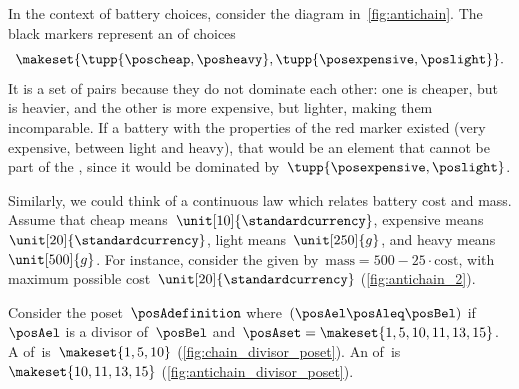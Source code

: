 \begin{marginfigure}
    \centering
    \caption{Example of discrete .
    }
    \label{fig:antichain}
\end{marginfigure}
\begin{example}
    In the context of battery choices, consider the diagram in~\cref{fig:antichain}.
    The black markers represent an  of choices
    \begin{equation}\label{eq:example-battery-antichain}
        \makeset{
            \tupp{\poscheap,\posheavy},
            \tupp{\posexpensive,\poslight}
        }.
    \end{equation}
    It is a set of pairs because they do not dominate each other: one is cheaper, but is heavier, and the other is more expensive, but lighter, making them incomparable.
    If a battery with the properties of the red marker existed (very expensive, between light and heavy), that would be an element that cannot be part of the , since it would be dominated by~$\tupp{\posexpensive,\poslight}$.
    \begin{marginfigure}
        \centering
        \caption{Example of continuous .}
        \label{fig:antichain_2}
    \end{marginfigure}
    Similarly, we could think of a continuous law which relates battery cost and mass.
    Assume that cheap means~$\unit[10]{\standardcurrency}$, expensive means~$\unit[20]{\standardcurrency}$, light means~$\unit[250]{g}$, and heavy means~$\unit[500]{g}$.
    For instance, consider the  given by~$\text{mass}=500-25\cdot \text{cost}$, with maximum possible cost~$\unit[20]{\standardcurrency}$ (\cref{fig:antichain_2}).
\end{example}

\vspace{5cm}

\begin{marginfigure}
    \centering
    \caption{}
    \label{fig:chain_divisor_poset}
\end{marginfigure}

\begin{marginfigure}
    \centering
    \caption{}
    \label{fig:antichain_divisor_poset}
\end{marginfigure}

\begin{example}
    Consider the poset~$\posAdefinition$ where~$(\posAel \posAleq \posBel)$ if~$\posAel$ is a divisor of~$\posBel$ and~$\posAset=\makeset{1,5,10,11,13,15}$.
    A  of~\posA is~$\makeset{1,5,10}$ (\cref{fig:chain_divisor_poset}).
    An  of~\posA is~$\makeset{10,11,13,15}$ (\cref{fig:antichain_divisor_poset}).
\end{example}

